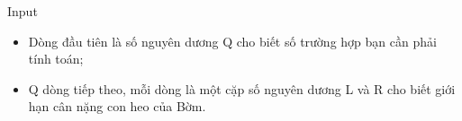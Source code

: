 Input  
\begin{itemize}
	\item     Dòng đầu tiên là số nguyên dương Q cho biết số trường hợp bạn cần phải tính toán;   
	\item     Q dòng tiếp theo, mỗi dòng là một cặp số nguyên dương L và R cho biết giới hạn cân nặng con heo của Bờm.   
\end{itemize}